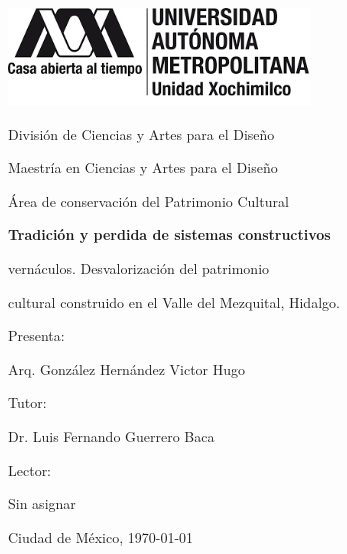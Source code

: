 \begin{titlepage}

	{\includegraphics[width=0.6\textwidth]{./imagenes/logo_uam/logo_completo.png}\par}
	\vspace{0.5cm}
	{\large División de Ciencias y Artes para el Diseño\par}
	{\small Maestría en Ciencias y Artes para el Diseño\par}
	{\small Área de conservación del Patrimonio Cultural\par}
	\vspace{1.5cm}
	{\bfseries \Large Tradición y perdida de sistemas constructivos\par vernáculos. Desvalorización del patrimonio\par cultural construido en el Valle del Mezquital, Hidalgo.\par}
	\vspace{1.5cm}
	{\small Presenta:\par}
	{Arq. González Hernández Victor Hugo\par}
	{\small Tutor:\par}
	{Dr. Luis Fernando Guerrero Baca\par}
	{\small Lector:\par}
	{Sin asignar\par}
	\vspace{1cm}
	{\small Ciudad de México, \today \par}

\end{titlepage}
